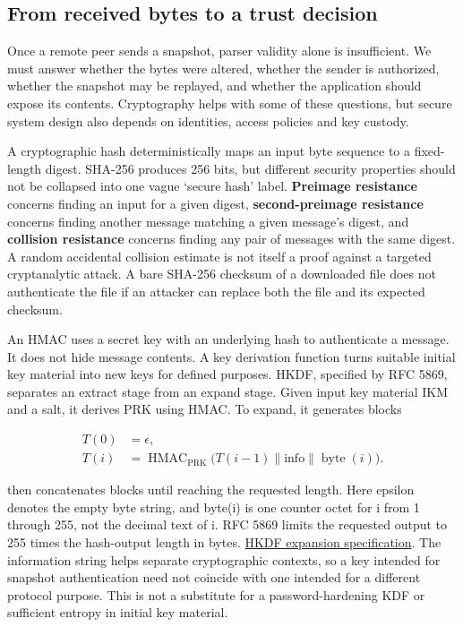 \subsection{From received bytes to a trust decision}\label{from-received-bytes-to-a-trust-decision}

Once a remote peer sends a snapshot, parser validity alone is insufficient. We must answer whether the bytes were altered, whether the sender is authorized, whether the snapshot may be replayed, and whether the application should expose its contents. Cryptography helps with some of these questions, but secure system design also depends on identities, access policies and key custody.

A cryptographic hash deterministically maps an input byte sequence to a fixed-length digest. SHA-256 produces 256 bits, but different security properties should not be collapsed into one vague `secure hash' label. \textbf{Preimage resistance} concerns finding an input for a given digest, \textbf{second-preimage resistance} concerns finding another message matching a given message's digest, and \textbf{collision resistance} concerns finding any pair of messages with the same digest. A random accidental collision estimate is not itself a proof against a targeted cryptanalytic attack. A bare SHA-256 checksum of a downloaded file does not authenticate the file if an attacker can replace both the file and its expected checksum.

An HMAC uses a secret key with an underlying hash to authenticate a message. It does not hide message contents. A key derivation function turns suitable initial key material into new keys for defined purposes. HKDF, specified by RFC 5869, separates an extract stage from an expand stage. Given input key material IKM and a salt, it derives PRK using HMAC. To expand, it generates blocks

\[
\begin{aligned}
T(0)&=\epsilon,\\
T(i)&=\operatorname{HMAC}_{\mathrm{PRK}}
\bigl(T(i-1)\parallel\mathrm{info}\parallel\operatorname{byte}(i)\bigr).
\end{aligned}
\]

then concatenates blocks until reaching the requested length. Here epsilon denotes the empty byte string, and byte(i) is one counter octet for i from 1 through 255, not the decimal text of i. RFC 5869 limits the requested output to 255 times the hash-output length in bytes. \href{https://www.rfc-editor.org/rfc/rfc5869.html\#section-2.3}{HKDF expansion specification}. The information string helps separate cryptographic contexts, so a key intended for snapshot authentication need not coincide with one intended for a different protocol purpose. This is not a substitute for a password-hardening KDF or sufficient entropy in initial key material.

